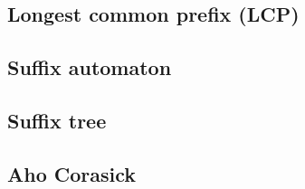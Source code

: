 \subsection{Longest common prefix (LCP)}


\subsection{Suffix automaton}


\subsection{Suffix tree}


\subsection{Aho Corasick}
